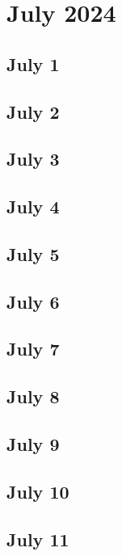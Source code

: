 %
%
%

\chapter{July 2024}
\label{intro} %

\section{July 1}

\section{July 2}

\section{July 3}

\section{July 4}

\section{July 5}

\section{July 6}

\section{July 7}

\section{July 8}

\section{July 9}

\section{July 10}

\section{July 11}

